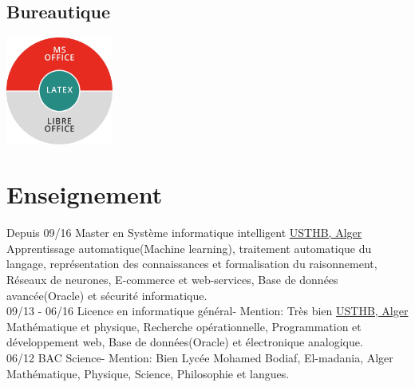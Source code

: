 \documentclass[]{friggeri-cv}
\begin{document}
\begin{aside}
  \section{Bureautique}
    \includegraphics[width=100pt]{img/bureautique.jpg}
    ~
\end{aside}
\vspace{0.42cm}
\section{Enseignement}
\begin{entrylist}
  \entry
    {Depuis 09/16}
    {Master en  Système informatique intelligent}
    {\href{http://www.usthb.dz/IMG/pdf/Master-SII.pdf}{USTHB, Alger}}
    {Apprentissage automatique(Machine learning), traitement automatique du langage, représentation des connaissances et formalisation du raisonnement, Réseaux de neurones, E-commerce et web-services, Base de données avancée(Oracle) et sécurité informatique.\\}
  \entry
    {09/13 - 06/16}
    {Licence en informatique général- Mention: Très bien}
    {\href{http://www.usthb.dz/spip.php?article47}{USTHB, Alger}}
    {Mathématique et physique, Recherche opérationnelle, Programmation et développement web,  Base de données(Oracle) et électronique analogique.\\}
  \entry
    {06/12}
    {BAC Science- Mention: Bien}
    {Lycée Mohamed Bodiaf, El-madania, Alger}
    {Mathématique, Physique, Science, Philosophie et langues.}
\end{entrylist}

\vspace{0.3cm}
\end{document}
